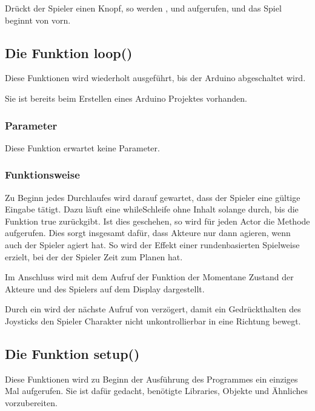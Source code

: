 \documentclass[letterpaper,10pt,ngerman]{sphinxmanual}
\begin{document}
Drückt der Spieler einen Knopf, so werden ,
 und  aufgerufen, und das Spiel beginnt von
vorn.


\subsection{Die Funktion loop()}
\label{\detokenize{programming:die-funktion-loop}}
Diese Funktionen wird wiederholt ausgeführt, bis der Arduino abgeschaltet wird.

Sie ist bereits beim Erstellen eines Arduino Projektes vorhanden.


\subsubsection{Parameter}
\label{\detokenize{programming:id13}}
Diese Funktion erwartet keine Parameter.


\subsubsection{Funktionsweise}
\label{\detokenize{programming:id14}}
Zu Beginn jedes Durchlaufes wird darauf gewartet, dass der Spieler eine gültige
Eingabe tätigt. Dazu läuft eine while\sphinxhyphen{}Schleife ohne Inhalt solange durch,
bis die Funktion  true zurückgibt. Ist dies geschehen, so wird
für jeden Actor die Methode  aufgerufen. Dies sorgt insgesamt dafür,
dass Akteure nur dann agieren, wenn auch der Spieler agiert hat. So wird der
Effekt einer rundenbasierten Spielweise erzielt, bei der der Spieler Zeit zum
Planen hat.

Im Anschluss wird mit dem Aufruf der Funktion  der Momentane Zustand
der Akteure und des Spielers auf dem Display dargestellt.

Durch ein  wird der nächste Aufruf von  verzögert,
damit ein Gedrückthalten des Joysticks den Spieler Charakter nicht
unkontrollierbar in eine Richtung bewegt.


\subsection{Die Funktion setup()}
\label{\detokenize{programming:die-funktion-setup}}
Diese Funktionen wird zu Beginn der Ausführung des Programmes ein einziges Mal
aufgerufen. Sie ist dafür gedacht, benötigte Libraries, Objekte und Ähnliches
vorzubereiten.
\end{document}

